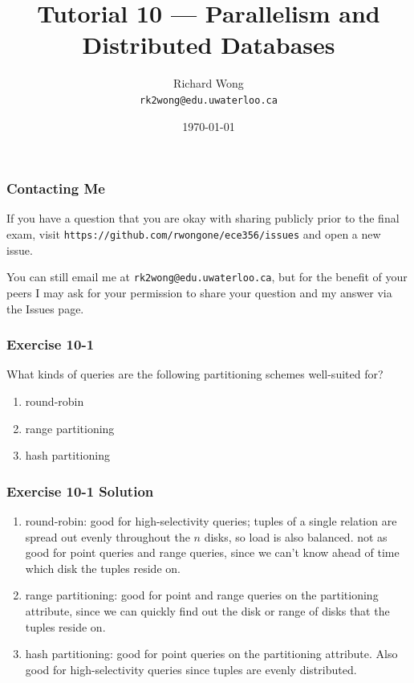 

\def\ojoin{\setbox0=\hbox{$\bowtie$}%
  \rule[-.02ex]{.25em}{.4pt}\llap{\rule[\ht0]{.25em}{.4pt}}}
\def\leftouterjoin{\mathbin{\ojoin\mkern-5.8mu\bowtie}}

\title{Tutorial 10 --- Parallelism and Distributed Databases }

\author{Richard Wong \\ \small \texttt{rk2wong@edu.uwaterloo.ca}}
\date{\today}




\begin{frame}
  \titlepage

\end{frame}

\begin{frame}
\frametitle{Contacting Me}

If you have a question that you are okay with sharing publicly prior to the final exam, visit \texttt{https://github.com/rwongone/ece356/issues} and open a new issue.

You can still email me at \texttt{rk2wong@edu.uwaterloo.ca}, but for the benefit of your peers I may ask for your permission to share your question and my answer via the Issues page.

\end{frame}

\begin{frame}
\frametitle{Exercise 10-1}

What kinds of queries are the following partitioning schemes well-suited for?

\begin{enumerate}
  \item round-robin
  \item range partitioning
  \item hash partitioning
\end{enumerate}

\end{frame}


\begin{frame}
\frametitle{Exercise 10-1 Solution}

\begin{enumerate}
  \item round-robin: good for high-selectivity queries; tuples of a single relation are spread out evenly throughout the $n$ disks, so load is also balanced. not as good for point queries and range queries, since we can't know ahead of time which disk the tuples reside on.
  \item range partitioning: good for point and range queries on the partitioning attribute, since we can quickly find out the disk or range of disks that the tuples reside on.
  \item hash partitioning: good for point queries on the partitioning attribute. Also good for high-selectivity queries since tuples are evenly distributed.
\end{enumerate}

\end{frame}


